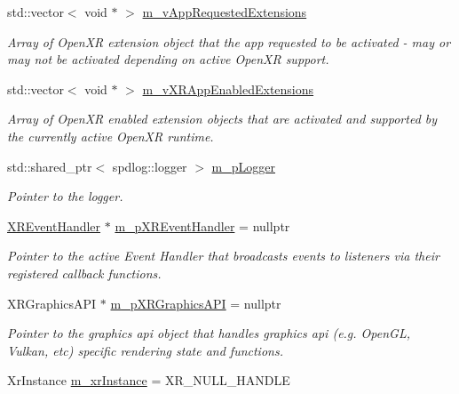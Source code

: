 \begin{DoxyCompactItemize}
std\+::vector$<$ void $\ast$ $>$ \mbox{\hyperlink{class_open_x_r_provider_1_1_x_r_core_ad5f0fc798b07a6b0aac7c94084ac0c6d}{m\+\_\+v\+App\+Requested\+Extensions}}
\begin{DoxyCompactList}\small\item\em Array of Open\+XR extension object that the app requested to be activated -\/ may or may not be activated depending on active Open\+XR support. \end{DoxyCompactList}\item 
std\+::vector$<$ void $\ast$ $>$ \mbox{\hyperlink{class_open_x_r_provider_1_1_x_r_core_aa07e03d01cdf71c4ce8a9dede09919a6}{m\+\_\+v\+X\+R\+App\+Enabled\+Extensions}}
\begin{DoxyCompactList}\small\item\em Array of Open\+XR enabled extension objects that are activated and supported by the currently active Open\+XR runtime. \end{DoxyCompactList}\item 
std\+::shared\+\_\+ptr$<$ spdlog\+::logger $>$ \mbox{\hyperlink{class_open_x_r_provider_1_1_x_r_core_a507f6635cdef638f7cf6fc4588b44d84}{m\+\_\+p\+Logger}}
\begin{DoxyCompactList}\small\item\em Pointer to the logger. \end{DoxyCompactList}\item 
\mbox{\hyperlink{class_open_x_r_provider_1_1_x_r_event_handler}{X\+R\+Event\+Handler}} $\ast$ \mbox{\hyperlink{class_open_x_r_provider_1_1_x_r_core_a71287a3895f32191616d9e9baec5052b}{m\+\_\+p\+X\+R\+Event\+Handler}} = nullptr
\begin{DoxyCompactList}\small\item\em Pointer to the active Event Handler that broadcasts events to listeners via their registered callback functions. \end{DoxyCompactList}\item 
X\+R\+Graphics\+A\+PI $\ast$ \mbox{\hyperlink{class_open_x_r_provider_1_1_x_r_core_a93b6c87c04372c24bd7d2cf1b1e72f41}{m\+\_\+p\+X\+R\+Graphics\+A\+PI}} = nullptr
\begin{DoxyCompactList}\small\item\em Pointer to the graphics api object that handles graphics api (e.\+g. Open\+GL, Vulkan, etc) specific rendering state and functions. \end{DoxyCompactList}\item 
Xr\+Instance \mbox{\hyperlink{class_open_x_r_provider_1_1_x_r_core_a93ef906b53a23959df73da18d205c737}{m\+\_\+xr\+Instance}} = X\+R\+\_\+\+N\+U\+L\+L\+\_\+\+H\+A\+N\+D\+LE

\end{DoxyCompactItemize}
